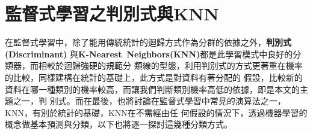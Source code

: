 %
%
\chapter{\MJH 監督式學習之判別式與KNN}
	在監督式學習中，除了能用傳統統計的迴歸方式作為分群的依據之外，\textbf{判別式(Discriminant)}		與\textbf{K-Nearest\ Neighbors(KNN)}都是此學習模式中良好的分類器，而相較於迴歸強硬的規範分		類線的型態，利用判別式的方式更著重在機率的比較，同樣建構在統計的基礎上，此方式是對資料有著分配的		假設，比較新的資料在哪一種類別的機率較高，而讓我們判斷類別機率高低的依據，即是本文的主題之一，判		別式。而在最後，也將討論在監督式學習中常見的演算法之一，KNN，有別於統計的基礎，KNN在不需經由任		何假設的情況下，透過機器學習的概念做基本預測與分類，以下也將逐一探討這幾種分類方式。
